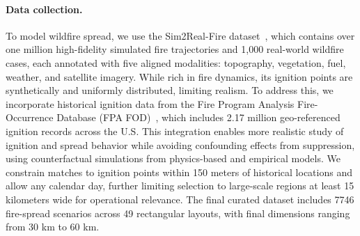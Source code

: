 \documentclass{article}
\newcommand{\layoutsNo}{49}
\newcommand{\scenariosNo}{7746}
\begin{document}
\paragraph{Data collection.} To model wildfire spread, we use the Sim2Real-Fire dataset~\citep{NEURIPS2024_02e978a2}, which contains over one million high-fidelity simulated fire trajectories and 1,000 real-world wildfire cases, each annotated with five aligned modalities: topography, vegetation, fuel, weather, and satellite imagery. While rich in fire dynamics, its ignition points are synthetically and uniformly distributed, limiting realism. To address this, we incorporate historical ignition data from the Fire Program Analysis Fire-Occurrence Database (FPA FOD)~\citep{short2021spatial}, which includes 2.17 million geo-referenced ignition records across the U.S. This integration enables more realistic study of ignition and spread behavior while avoiding confounding effects from suppression, using counterfactual simulations from physics-based and empirical models. We constrain matches to ignition points within 150 meters of historical locations and allow any calendar day, further limiting selection to large-scale regions at least 15 kilometers wide for operational relevance. The final curated dataset includes \scenariosNo{} fire-spread scenarios across \layoutsNo{} rectangular layouts, with final dimensions ranging from 30 km to 60 km.





\end{document}
